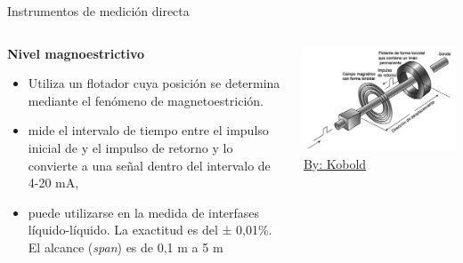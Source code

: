 \documentclass[aspectratio=169]{beamer}
\begin{document}
\begin{frame}{Instrumentos de medición directa}
    \begin{columns}[c, onlytextwidth]
        \begin{column}{0.45\textwidth}
        \textbf{Nivel magnoestrictivo}
            \begin{itemize}
                \item Utiliza un flotador cuya posición se determina mediante el fenómeno de magnetoestrición.  
                \item mide el intervalo de tiempo entre el impulso inicial de y el impulso de retorno y lo convierte a una señal dentro del intervalo de 4-20 mA,  
                \item puede utilizarse en la medida de interfases líquido-líquido. La exactitud es del ± 0,01\%. El alcance (\textit{span}) es de 0,1 m a 5 m
            \end{itemize}
        \end{column}
        \begin{column}{0.50\textwidth}
            \includegraphics[width = 1.1\linewidth]{fig/Nivel/Magnetostrictivo.jpg}
            \tiny{\href{https://www.kobold.com/uploads/files/n2es_nmt.pdf}{By: Kobold}}
        \end{column}
    \end{columns}
\end{frame}
\end{document}
